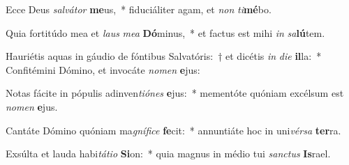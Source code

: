 \item Ecce Deus \textit{sal}\textit{vá}\textit{tor} \textbf{me}us,~* fiduciáliter agam, et \textit{non} \textit{ti}\textbf{mé}bo.
\item Quia fortitúdo mea et \textit{laus} \textit{me}\textit{a} \textbf{Dó}minus,~* et factus est mihi \textit{in} \textit{sa}\textbf{lú}tem.
\item Hauriétis aquas in gáudio de fóntibus Salvatóris:~† et dicétis \textit{in} \textit{di}\textit{e} \textbf{il}la:~* Confitémini Dómino, et invocáte \textit{no}\textit{men} \textbf{e}jus:
\item Notas fácite in pópulis adinven\textit{ti}\textit{ó}\textit{nes} \textbf{e}jus:~* mementóte quóniam excélsum est \textit{no}\textit{men} \textbf{e}jus.
\item Cantáte Dómino quóniam ma\textit{gní}\textit{fi}\textit{ce} \textbf{fe}cit:~* annuntiáte hoc in uni\textit{vér}\textit{sa} \textbf{ter}ra.
\item Exsúlta et lauda habi\textit{tá}\textit{ti}\textit{o} \textbf{Si}on:~* quia magnus in médio tui \textit{sanc}\textit{tus} \textbf{Is}rael.
